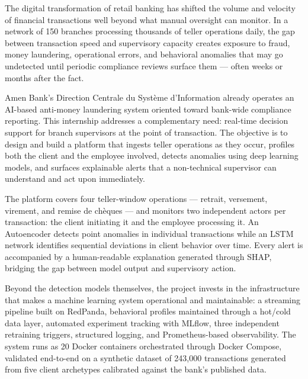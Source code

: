 The digital transformation of retail banking has shifted the volume and
velocity of financial transactions well beyond what manual oversight can
monitor. In a network of 150 branches processing thousands of teller
operations daily, the gap between transaction speed and supervisory
capacity creates exposure to fraud, money laundering, operational errors,
and behavioral anomalies that may go undetected until periodic compliance
reviews surface them --- often weeks or months after the fact.

Amen Bank's Direction Centrale du Système d'Information already operates
an AI-based anti-money laundering system oriented toward bank-wide
compliance reporting. This internship addresses a complementary need:
real-time decision support for branch supervisors at the point of
transaction. The objective is to design and build a platform that ingests
teller operations as they occur, profiles both the client and the
employee involved, detects anomalies using deep learning models, and
surfaces explainable alerts that a non-technical supervisor can
understand and act upon immediately.

The platform covers four teller-window operations --- retrait, versement,
virement, and remise de chèques --- and monitors two independent actors
per transaction: the client initiating it and the employee processing it.
An Autoencoder detects point anomalies in individual transactions while
an LSTM network identifies sequential deviations in client behavior over
time. Every alert is accompanied by a human-readable explanation
generated through SHAP, bridging the gap between model output and
supervisory action.

Beyond the detection models themselves, the project invests in the
infrastructure that makes a machine learning system operational and
maintainable: a streaming pipeline built on RedPanda, behavioral
profiles maintained through a hot/cold data layer, automated experiment
tracking with MLflow, three independent retraining triggers, structured
logging, and Prometheus-based observability. The system runs as 20
Docker containers orchestrated through Docker Compose, validated
end-to-end on a synthetic dataset of 243,000 transactions generated
from five client archetypes calibrated against the bank's published
data.

